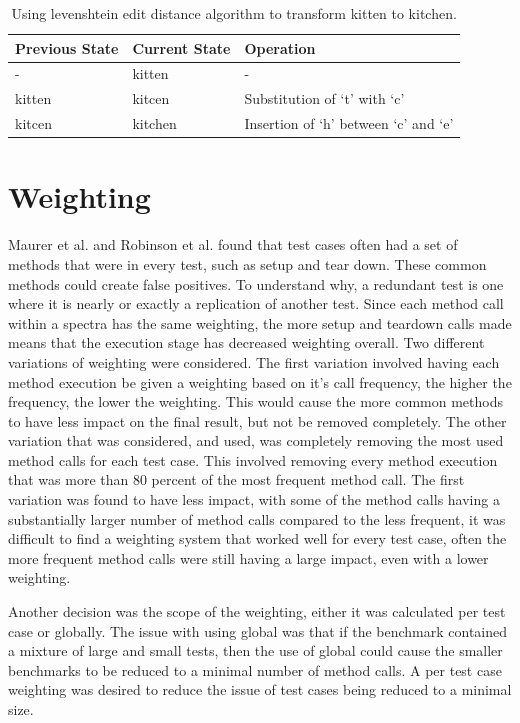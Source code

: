 \begin{table}[]
\centering

\begin{tabular}{|l|l|l|}
\hline
{\bf Previous State} & {\bf Current State} & {\bf Operation}                      \\ \hline
-                    & kitten              & -                                    \\ \hline
kitten               & kitcen              & Substitution of `t' with `c'         \\ \hline
kitcen               & kitchen             & Insertion of `h' between `c' and `e' \\ \hline
\end{tabular}
\caption{Using levenshtein edit distance algorithm to transform kitten to kitchen.}
\label{levenTable}
\end{table}

\section{Weighting}
Maurer et al. \cite{koochakzadeh2009test} and Robinson et al. \cite{li2008static} found that test cases often had a set of methods that were in every test, such as setup and tear down. These common methods could create false positives. To understand why, a redundant test is one where it is nearly or exactly a replication of another test. Since each method call within a spectra has the same weighting, the more setup and teardown calls made means that the execution stage has decreased weighting overall. Two different variations of weighting were considered. The first variation involved having each method execution be given a weighting based on it's call frequency, the higher the frequency, the lower the weighting. This would cause the more common methods to have less impact on the final result, but not be removed completely. The other variation that was considered, and used, was completely removing the most used method calls for each test case. This involved removing every method execution that was more than 80 percent of the most frequent method call. The first variation was found to have less impact, with some of the method calls having a substantially larger number of method calls compared to the less frequent, it was difficult to find a weighting system that worked well for every test case, often the more frequent method calls were still having a large impact, even with a lower weighting.

Another decision was the scope of the weighting, either it was calculated per test case or globally. The issue with using global was that if the benchmark contained a mixture of large and small tests, then the use of global could cause the smaller benchmarks to be reduced to a minimal number of method calls. A per test case weighting was desired to reduce the issue of test cases being reduced to a minimal size.
